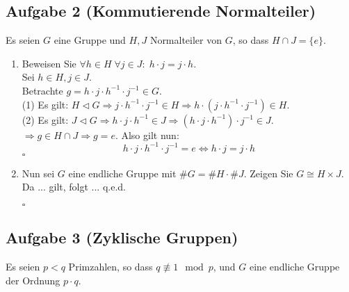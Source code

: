 \documentclass[11pt,a4paper,ngerman]{article}
\begin{document}
\subsection*{Aufgabe 2 \mdseries (Kommutierende Normalteiler)}
Es seien $G$ eine Gruppe und $H,J$ Normalteiler von $G$, so dass $H \cap J = \{e\}$.
\begin{enumerate}[\bfseries a)]
\item  Beweisen Sie $\forall h \in H \; \forall j \in J :\; h \cdot j = j \cdot h$. \\

Sei $h \in H, j \in J$. \\
Betrachte $g = h \cdot j \cdot h^{-1} \cdot j^{-1} \in G$. \\
(1) Es gilt: $H \lhd G \Rightarrow j \cdot h^{-1} \cdot j^{-1} \in H \Rightarrow h \cdot (j \cdot h^{-1} \cdot j^{-1}) \in H$. \\
(2) Es gilt: $J \lhd G \Rightarrow h \cdot j \cdot h^{-1} \in J \Rightarrow (h \cdot j \cdot h^{-1}) \cdot j^{-1} \in J$. \\
$\Rightarrow g \in H \cap J \Rightarrow g = e$.
Also gilt nun:
$$
h \cdot j \cdot h^{-1} \cdot j^{-1} = e \Leftrightarrow h \cdot j = j \cdot h
$$
\mbox{} \hfill $\square$
\item  Nun sei $G$ eine endliche Gruppe mit $\#G = \#H \cdot \#J$. Zeigen Sie $G \cong H \times J$. \\

Da ... gilt, folgt ... q.e.d.

\mbox{} \hfill $\square$
\end{enumerate}

\pagebreak


\subsection*{Aufgabe 3 \mdseries (Zyklische Gruppen)}
Es seien $p < q$ Primzahlen, so dass $q \not\equiv 1 \mod p$, und $G$ eine endliche Gruppe der Ordnung $p \cdot q$.
\end{document}
